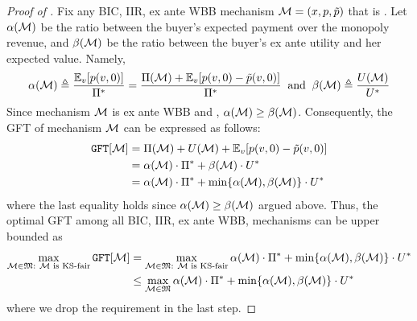 \begin{proof}[Proof of ]
Fix any BIC, IIR, ex ante WBB mechanism $\mathcal{M} =(x,p,\tilde{p})$ that is {\ksfair}. Let $\alpha(\mathcal{M})$ be the ratio between the buyer's expected payment over the monopoly revenue, and $\beta(\mathcal{M})$ be the ratio between the buyer's ex ante utility and her expected value. Namely,
\begin{align*}
    \revratio(\mech) \triangleq  
    \frac{\expect[\val]{\price(\val,0)}}{\sellerbenchmark}
    =
    \frac{\sellerexanteutil(\mech) + \expect[\val]{\price(\val,0) - \sellerprice(\val,0)}}{\sellerbenchmark} 
    \;\;
    \mbox{and}
    \;\;
    \residuesurplusratio(\mech) \triangleq \frac{\buyerexanteutil(\mech)}{\buyerbenchmark}
\end{align*}
Since mechanism $\mathcal{M}$ is ex ante WBB and {\ksfair}, $\alpha(\mathcal{M}) \geq \beta(\mathcal{M})$. Consequently, the GFT of mechanism $\mathcal{M}$ can be expressed as follows:
\begin{align*}
    \GFT{\mech} 
    &= \sellerexanteutil(\mech) + \buyerexanteutil(\mech) + \expect[\val]{\price(\val,0) - \sellerprice(\val,0)}
    \\
    &=
    \revratio(\mech) \cdot \sellerbenchmark
    +
    \residuesurplusratio(\mech) \cdot \buyerbenchmark
    \\
    &=
    \revratio(\mech) \cdot \sellerbenchmark
    +
    \min\{\revratio(\mech), \residuesurplusratio(\mech)\} \cdot \buyerbenchmark
\end{align*}
where the last equality holds since $\alpha(\mathcal{M}) \geq \beta(\mathcal{M})$ argued above. Thus, the optimal GFT among all BIC, IIR, ex ante WBB, {\ksfair} mechanisms can be upper bounded as
\begin{align}
\nonumber
    \max_{\substack{\mech\in\mechfam:~\text{$\mech$ is {\ksfair}}}} \GFT{\mech}
    & =
    \max_{\substack{\mech\in\mechfam:~\text{$\mech$ is {\ksfair}}}}  \revratio(\mech) \cdot \sellerbenchmark
    +
    \min\{\revratio(\mech), \residuesurplusratio(\mech)\} \cdot \buyerbenchmark
    \\
\label{eq:fixed price mech suffices:mhr UB}
    &\leq 
    \max_{\substack{\mech\in\mechfam}}  \revratio(\mech) \cdot \sellerbenchmark
    +
    \min\{\revratio(\mech), \residuesurplusratio(\mech)\} \cdot \buyerbenchmark
\end{align}
where we drop the {\ksfairness} requirement in the last step. 


\end{proof}
